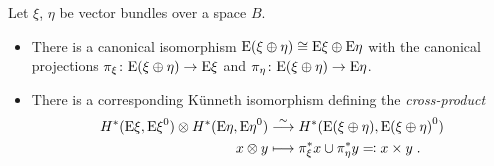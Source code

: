 \begin{Rem}
  Let $\xi$, $\eta$ be vector bundles over a space $B$.
  \begin{itemize}
  \item There is a canonical isomorphism
    $\mathrm{E}(\xi\oplus\eta)\cong\mathrm{E}\xi\oplus\mathrm{E}\eta$
    with the canonical projections
    $\pi_\xi\colon \mathrm{E}(\xi\oplus\eta)\to \mathrm{E}\xi$
    and
    $\pi_\eta\colon\mathrm{E}(\xi\oplus\eta)\to \mathrm{E}\eta$.
  \item There is a corresponding Künneth isomorphism
    defining the \emph{cross-product} 
    \begin{align*}
      H^*(\mathrm{E}\xi, {\mathrm{E}\xi}^0)
      \otimes
      H^*(\mathrm{E}\eta, {\mathrm{E}\eta}^0)
      &\overset{\sim}{\longrightarrow}
        H^*(\mathrm{E}(\xi\oplus\eta), {\mathrm{E}(\xi\oplus\eta)}^0)\\
      x\otimes y
      &\longmapsto
        {\pi}^*_\xi x \cup {\pi}^*_\eta y
        \eqqcolon x\times y
        \;.
    \end{align*}
    \cite[Theorem~3.18]{hatcher}
  \end{itemize}
\end{Rem}
